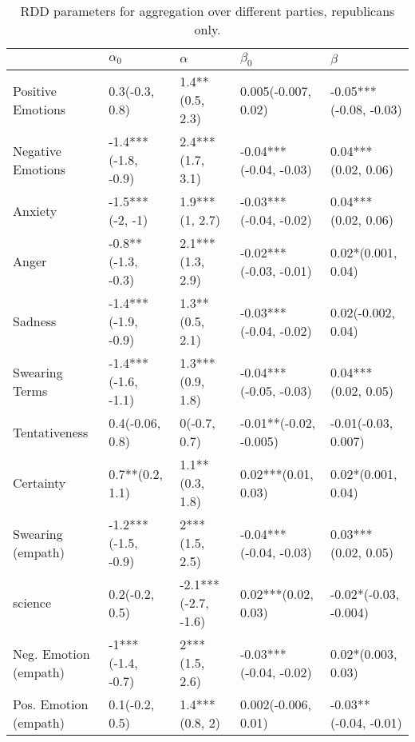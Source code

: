\begin{table}[h]\centering
\begin{adjustbox}{width=\linewidth, center}
	\begin{tabular}{lllll}
	\toprule
	{} &           $\alpha_0$ &             $\alpha$ &               $\beta_0$ &                 $\beta$ \\
	\midrule
	Positive Emotions     &       0.3(-0.3, 0.8) &      1.4**(0.5, 2.3) &     0.005(-0.007, 0.02) &  -0.05***(-0.08, -0.03) \\
	Negative Emotions     &  -1.4***(-1.8, -0.9) &     2.4***(1.7, 3.1) &  -0.04***(-0.04, -0.03) &     0.04***(0.02, 0.06) \\
	Anxiety               &      -1.5***(-2, -1) &       1.9***(1, 2.7) &  -0.03***(-0.04, -0.02) &     0.04***(0.02, 0.06) \\
	Anger                 &   -0.8**(-1.3, -0.3) &     2.1***(1.3, 2.9) &  -0.02***(-0.03, -0.01) &      0.02*(0.001, 0.04) \\
	Sadness               &  -1.4***(-1.9, -0.9) &      1.3**(0.5, 2.1) &  -0.03***(-0.04, -0.02) &      0.02(-0.002, 0.04) \\
	Swearing Terms        &  -1.4***(-1.6, -1.1) &     1.3***(0.9, 1.8) &  -0.04***(-0.05, -0.03) &     0.04***(0.02, 0.05) \\
	Tentativeness         &      0.4(-0.06, 0.8) &         0(-0.7, 0.7) &  -0.01**(-0.02, -0.005) &     -0.01(-0.03, 0.007) \\
	Certainty             &      0.7**(0.2, 1.1) &      1.1**(0.3, 1.8) &     0.02***(0.01, 0.03) &      0.02*(0.001, 0.04) \\
	Swearing (empath)     &  -1.2***(-1.5, -0.9) &       2***(1.5, 2.5) &  -0.04***(-0.04, -0.03) &     0.03***(0.02, 0.05) \\
	science               &       0.2(-0.2, 0.5) &  -2.1***(-2.7, -1.6) &     0.02***(0.02, 0.03) &   -0.02*(-0.03, -0.004) \\
	Neg. Emotion (empath) &    -1***(-1.4, -0.7) &       2***(1.5, 2.6) &  -0.03***(-0.04, -0.02) &      0.02*(0.003, 0.03) \\
	Pos. Emotion (empath) &       0.1(-0.2, 0.5) &       1.4***(0.8, 2) &     0.002(-0.006, 0.01) &   -0.03**(-0.04, -0.01) \\
	\bottomrule
	\end{tabular}
	
\end{adjustbox}
	\caption{RDD parameters for aggregation over different parties, republicans only.}
	\label{fig: Party_3}
\end{table}

